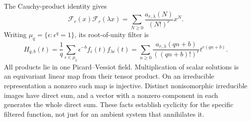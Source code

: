\documentclass[11pt,a4paper]{article}
\theoremstyle{definition}
\theoremstyle{remark}
\numberwithin{equation}{section}
\begin{document}
The Cauchy-product identity gives
\[
 \mathcal F_r(x)\mathcal F_r(\lambda x)
 =\sum_{N\ge0}\frac{a_{r,\lambda}(N)}{(N!)^r}x^N.
\]
Writing $\mu_q=\{\epsilon:\epsilon^q=1\}$, its root-of-unity
filter is
\begin{equation}\label{E:ac:filter}
 H_{q,b}(t)=\frac1q\sum_{\epsilon\in\mu_q}
                 \epsilon^{-b} f_\epsilon(t)f_{\lambda\epsilon}(t)
 =\sum_{n\ge0}\frac{a_{r,\lambda}(qn+b)}{((qn+b)!)^r}
                   t^{r(qn+b)}.
\end{equation}
All products lie in one Picard--Vessiot field. Multiplication of scalar
solutions is an equivariant linear map from their tensor product.
On an irreducible representation a nonzero such map is injective.
Distinct nonisomorphic irreducible images have direct sum, and a vector
with a nonzero component in each generates the whole direct sum.
These facts establish cyclicity for the specific filtered function,
not just for an ambient system that annihilates it.
\end{document}
